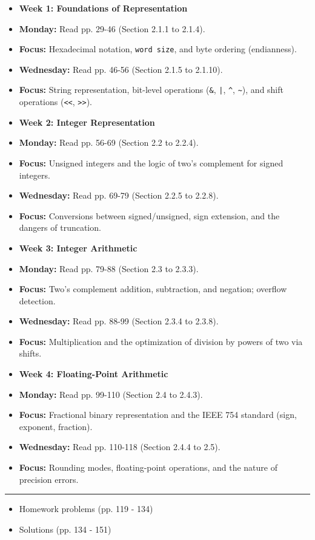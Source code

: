 \begin{itemize}
  \item \textbf{Week 1: Foundations of Representation}
  \item \textbf{Monday:} Read pp. 29-46 (Section 2.1.1 to 2.1.4).
  \item \textbf{Focus:} Hexadecimal notation, \texttt{word size}, and byte ordering (endianness).
  \item \textbf{Wednesday:} Read pp. 46-56 (Section 2.1.5 to 2.1.10).
  \item \textbf{Focus:} String representation, bit-level operations (\texttt{\&}, \texttt{|}, \texttt{\textasciicircum{}}, \texttt{\textasciitilde{}}), and shift operations (\texttt{\textless{}\textless{}}, \texttt{\textgreater{}\textgreater{}}).

  \item \textbf{Week 2: Integer Representation}
  \item \textbf{Monday:} Read pp. 56-69 (Section 2.2 to 2.2.4).
  \item \textbf{Focus:} Unsigned integers and the logic of two's complement for signed integers.
  \item \textbf{Wednesday:} Read pp. 69-79 (Section 2.2.5 to 2.2.8).
  \item \textbf{Focus:} Conversions between signed/unsigned, sign extension, and the dangers of truncation.

  \item \textbf{Week 3: Integer Arithmetic}
  \item \textbf{Monday:} Read pp. 79-88 (Section 2.3 to 2.3.3).
  \item \textbf{Focus:} Two's complement addition, subtraction, and negation; overflow detection.
  \item \textbf{Wednesday:} Read pp. 88-99 (Section 2.3.4 to 2.3.8).
  \item \textbf{Focus:} Multiplication and the optimization of division by powers of two via shifts.

  \item \textbf{Week 4: Floating-Point Arithmetic}
  \item \textbf{Monday:} Read pp. 99-110 (Section 2.4 to 2.4.3).
  \item \textbf{Focus:} Fractional binary representation and the IEEE 754 standard (sign, exponent, fraction).
  \item \textbf{Wednesday:} Read pp. 110-118 (Section 2.4.4 to 2.5).
  \item \textbf{Focus:} Rounding modes, floating-point operations, and the nature of precision errors.

\end{itemize}
\noindent\rule{\textwidth}{0.4pt}
\begin{itemize}
  \item Homework problems (pp. 119 - 134)
  \item Solutions (pp. 134 - 151)

\end{itemize}
